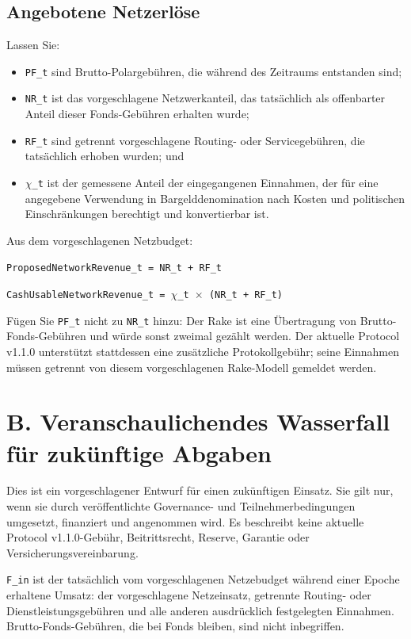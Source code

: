 \documentclass[11pt]{article}
\begin{document}
\subsection*{Angebotene Netzerlöse}

Lassen Sie:

\begin{itemize}[leftmargin=*]
\item \texttt{PF\_t} sind Brutto-Polargebühren, die während des Zeitraums entstanden sind;
\item \texttt{NR\_t} ist das vorgeschlagene Netzwerkanteil, das tatsächlich als offenbarter Anteil dieser Fonds-Gebühren erhalten wurde;
\item \texttt{RF\_t} sind getrennt vorgeschlagene Routing- oder Servicegebühren, die tatsächlich erhoben wurden; und
\item \texttt{$\chi$\_t} ist der gemessene Anteil der eingegangenen Einnahmen, der für eine angegebene Verwendung in Bargelddenomination nach Kosten und politischen Einschränkungen berechtigt und konvertierbar ist.
\end{itemize}
Aus dem vorgeschlagenen Netzbudget:

\texttt{ProposedNetworkRevenue\_t = NR\_t + RF\_t}

\texttt{CashUsableNetworkRevenue\_t = $\chi$\_t $\times$ (NR\_t + RF\_t)}

Fügen Sie \texttt{PF\_t} nicht zu \texttt{NR\_t} hinzu: Der Rake ist eine Übertragung von Brutto-Fonds-Gebühren und würde sonst zweimal gezählt werden. Der aktuelle Protocol v1.1.0 unterstützt stattdessen eine zusätzliche Protokollgebühr; seine Einnahmen müssen getrennt von diesem vorgeschlagenen Rake-Modell gemeldet werden.


\section*{B. Veranschaulichendes Wasserfall für zukünftige Abgaben}

Dies ist ein vorgeschlagener Entwurf für einen zukünftigen Einsatz. Sie gilt nur, wenn sie durch veröffentlichte Governance- und Teilnehmerbedingungen umgesetzt, finanziert und angenommen wird. Es beschreibt keine aktuelle Protocol v1.1.0-Gebühr, Beitrittsrecht, Reserve, Garantie oder Versicherungsvereinbarung.

\texttt{F\_in} ist der tatsächlich vom vorgeschlagenen Netzebudget während einer Epoche erhaltene Umsatz: der vorgeschlagene Netzeinsatz, getrennte Routing- oder Dienstleistungsgebühren und alle anderen ausdrücklich festgelegten Einnahmen. Brutto-Fonds-Gebühren, die bei Fonds bleiben, sind nicht inbegriffen.
\end{document}
